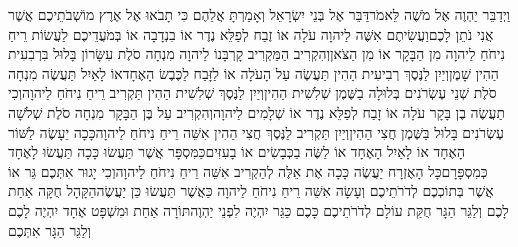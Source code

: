 \documentclass[../main/main.tex]{subfiles}
\begin{document}
\begin{multicols}{\ncols}
וַיְדַבֵּר יַהְוֶה אֶל מֹשֶׁה לֵּאמֹר\PreVerseSpace{}דַּבֵּר אֶל בְּנֵי יִשְׂרָאֵל וְאָמַרְתָּ אֲלֵהֶם כִּי תָבֹאוּ אֶל אֶרֶץ מוֹשְׁבֹתֵיכֶם אֲשֶׁר אֲנִי נֹתֵן לָכֶם\PreVerseSpace{}וַעֲשִׂיתֶם אִשֶּׁה לַיהוָה עֹלָה אוֹ זֶבַח לְפַלֵּא נֶדֶר אוֹ בִנְדָבָה אוֹ בְּמֹעֲדֵיכֶם לַעֲשׂוֹת רֵיחַ נִיחֹחַ לַיהוָה מִן הַבָּקָר אוֹ מִן הַצֹּאן\PreVerseSpace{}וְהִקְרִיב הַמַּקְרִיב קָרְבָּנוֹ לַיהוָה מִנְחָה סֹלֶת עִשָּׂרוֹן בָּלוּל בִּרְבִעִית הַהִין שָׁמֶן\PreVerseSpace{}וְיַיִן לַנֶּסֶךְ רְבִיעִית הַהִין תַּעֲשֶׂה עַל הָעֹלָה אוֹ לַזָּבַח לַכֶּבֶשׂ הָאֶחָד\PreVerseSpace{}אוֹ לָאַיִל תַּעֲשֶׂה מִנְחָה סֹלֶת שְׁנֵי עֶשְׂרֹנִים בְּלוּלָה בַשֶּׁמֶן שְׁלִשִׁית הַהִין\PreVerseSpace{}וְיַיִן לַנֶּסֶךְ שְׁלִשִׁית הַהִין תַּקְרִיב רֵיחַ נִיחֹחַ לַיהוָה\PreVerseSpace{}וְכִי תַעֲשֶׂה בֶן בָּקָר עֹלָה אוֹ זָבַח לְפַלֵּא נֶדֶר אוֹ שְׁלָמִים לַיהוָה\PreVerseSpace{}וְהִקְרִיב עַל בֶּן הַבָּקָר מִנְחָה סֹלֶת שְׁלֹשָׁה עֶשְׂרֹנִים בָּלוּל בַּשֶּׁמֶן חֲצִי הַהִין\PreVerseSpace{}וְיַיִן תַּקְרִיב לַנֶּסֶךְ חֲצִי הַהִין אִשֵּׁה רֵיחַ נִיחֹחַ לַיהוָה\PreVerseSpace{}כָּכָה יֵעָשֶׂה לַשּׁוֹר הָאֶחָד אוֹ לָאַיִל הָאֶחָד אוֹ לַשֶּׂה בַכְּבָשִׂים אוֹ בָעִזִּים\PreVerseSpace{}כַּמִּסְפָּר אֲשֶׁר תַּעֲשׂוּ כָּכָה תַּעֲשׂוּ לָאֶחָד כְּמִסְפָּרָם\PreVerseSpace{}כָּל הָאֶזְרָח יַעֲשֶׂה כָּכָה אֶת אֵלֶּה לְהַקְרִיב אִשֵּׁה רֵיחַ נִיחֹחַ לַיהוָה\PreVerseSpace{}וְכִי יָגוּר אִתְּכֶם גֵּר אוֹ אֲשֶׁר בְּתוֹכְכֶם לְדֹרֹתֵיכֶם וְעָשָׂה אִשֵּׁה רֵיחַ נִיחֹחַ לַיהוָה כַּאֲשֶׁר תַּעֲשׂוּ כֵּן יַעֲשֶׂה\PreVerseSpace{}הַקָּהָל חֻקָּה אַחַת לָכֶם וְלַגֵּר הַגָּר חֻקַּת עוֹלָם לְדֹרֹתֵיכֶם כָּכֶם כַּגֵּר יִהְיֶה לִפְנֵי יַהְוֶה\PreVerseSpace{}תּוֹרָה אַחַת וּמִשְׁפָּט אֶחָד יִהְיֶה לָכֶם וְלַגֵּר הַגָּר אִתְּכֶם\OpenSection{}\par

\end{multicols}
\end{document}
